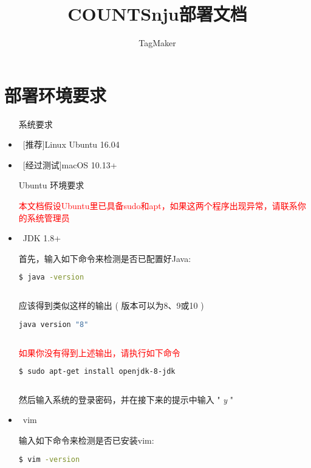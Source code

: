 \documentclass{ctexart}
\author{TagMaker}
\title{COUNTSnju部署文档}
\begin{document}
\maketitle
\newpage
\tableofcontents
\newpage
\section{部署环境要求}
\begin{itemize}
        \item [系统要求]
        \
        

        \item\  [推荐]Linux Ubuntu 16.04

        \item\  [经过测试]macOS 10.13+

        \item[Ubuntu 环境要求]
        \

        \textcolor{red}{本文档假设Ubuntu里已具备sudo和apt，如果这两个程序出现异常，请联系你的系统管理员}
        
        \item\ JDK 1.8+

        首先，输入如下命令来检测是否已配置好Java:

        \begin{lstlisting}[language=bash]
         $ java -version
                
        \end{lstlisting}

        应该得到类似这样的输出 ( 版本可以为8、9或10 )

        \begin{lstlisting}[language=bash]
         java version "8"
                
        \end{lstlisting}
        \textcolor{red}{如果你没有得到上述输出，请执行如下命令}
        \begin{lstlisting}[language=bash]
         $ sudo apt-get install openjdk-8-jdk
                       
        \end{lstlisting}
        然后输入系统的登录密码，并在接下来的提示中输入 " \emph{y} "

        \item\ vim

        输入如下命令来检测是否已安装vim:

        \begin{lstlisting}[language=bash]
         $ vim -version
                

\end{lstlisting}
\end{itemize}
\end{document}
